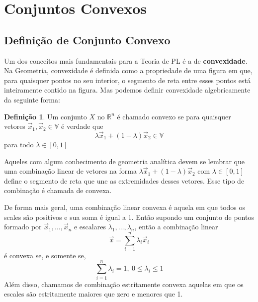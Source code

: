 \theoremstyle{definition}

\newtheorem{def:conjunto convexo}{Definição}[chapter]

\newtheorem{def:politopo}[def:conjunto convexo]{Definição}

\newtheorem{def:poliedro convexo}[def:conjunto convexo]{Definição}

\newtheorem{def:cone}[def:conjunto convexo]{Definição}

\newtheorem{def:cone hull}[def:conjunto convexo]{Definição}

\newtheorem{def:cone convexo}[def:conjunto convexo]{Definição}

\newtheorem{def:cpc}[def:conjunto convexo]{Definição}

\section{Conjuntos Convexos}

\subsection{Definição de Conjunto Convexo}

Um dos conceitos mais fundamentais para a Teoria de PL é a de \textbf{convexidade}.
Na Geometria, convexidade é definida como a propriedade de uma figura em que,
para quaisquer pontos no seu interior, o segmento de reta entre esses pontos
está inteiramente contido na figura. Mas podemos definir convexidade algebricamente
da seguinte forma:

\begin{def:conjunto convexo}
	\label{def:conjunto convexo}
	Um conjunto $X$ no $\mathbb{R}^n$ é chamado convexo se para quaisquer
	vetores $\vec x_1, \vec x_2 \in \mathbb{V}$ é verdade que
	\[\lambda \vec x_1 + (1 - \lambda)\vec x_2 \in \mathbb{V}\]
	para todo $\lambda \in [0, 1]$
\end{def:conjunto convexo}

Aqueles com algum conhecimento de geometria analítica devem se lembrar que uma
combinação linear de vetores na forma $\lambda \vec x_1 + (1 - \lambda)\vec x_2$
com $\lambda \in [0, 1]$ define o segmento de reta que une as extremidades desses
vetores. Esse tipo de combinação é chamada de convexa.

De forma mais geral, uma combinação linear convexa é aquela em que todos os
scales são positivos e sua soma é igual a 1. Então supondo um conjunto de pontos
formado por $\vec x_1, \ldots, \vec x_n$ e escalares $\lambda_1, \ldots, \lambda_n$,
então a combinação linear
\[\vec x = \sum_{i=1}^{n} \lambda_i \vec x_i\] é convexa se, e somente se,
\[\sum_{i=1}^{n} \lambda_i = 1,\ 0 \leq \lambda_i \leq 1\]
Além disso, chamamos de combinação estritamente convexa aquelas em que os escales
são estritamente maiores que zero e menores que 1.

